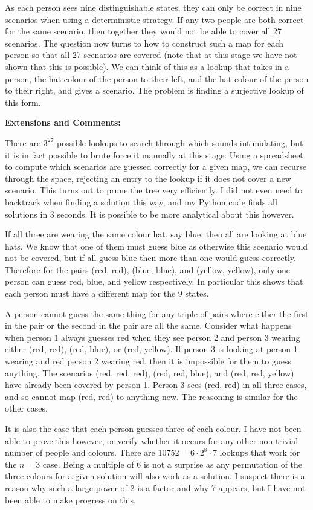 As each person sees nine distinguishable states, they can only be correct in nine scenarios when using a deterministic strategy. If any two people are both correct for the same scenario, then together they would not be able to cover all 27 scenarios. The question now turns to how to construct such a map for each person so that all 27 scenarios are covered (note that at this stage we have not shown that this is possible). We can think of this as a lookup that takes in a person, the hat colour of the person to their left, and the hat colour of the person to their right, and gives a scenario. The problem is finding a surjective lookup of this form.



\textbf{Extensions and Comments:}

There are $3^27$ possible lookups to search through which sounds intimidating, but it is in fact possible to brute force it manually at this stage. Using a spreadsheet to compute which scenarios are guessed correctly for a given map, we can recurse through the space, rejecting an entry to the lookup if it does not cover a new scenario. This turns out to prune the tree very efficiently. I did not even need to backtrack when finding a solution this way, and my Python code finds all solutions in 3 seconds. It is possible to be more analytical about this however.

If all three are wearing the same colour hat, say blue, then all are looking at blue hats. We know that one of them must guess blue as otherwise this scenario would not be covered, but if all guess blue then more than one would guess correctly. Therefore for the pairs (red, red), (blue, blue), and (yellow, yellow), only one person can guess red, blue, and yellow respectively. In particular this shows that each person must have a different map for the 9 states.

A person cannot guess the same thing for any triple of pairs where either the first in the pair or the second in the pair are all the same. Consider what happens when person 1 always guesses red when they see person 2 and person 3 wearing either (red, red), (red, blue), or (red, yellow). If person 3 is looking at person 1 wearing and red person 2 wearing red, then it is impossible for them to guess anything. The scenarios (red, red, red), (red, red, blue), and (red, red, yellow) have already been covered by person 1. Person 3 sees (red, red) in all three cases, and so cannot map (red, red) to anything new. The reasoning is similar for the other cases.

It is also the case that each person guesses three of each colour. I have not been able to prove this however, or verify whether it occurs for any other non-trivial number of people and colours. There are $10752 = 6 \cdot 2^8 \cdot 7$ lookups that work for the $n = 3$ case. Being a multiple of 6 is not a surprise as any permutation of the three colours for a given solution will also work as a solution. I suspect there is a reason why such a large power of 2 is a factor and why 7 appears, but I have not been able to make progress on this.